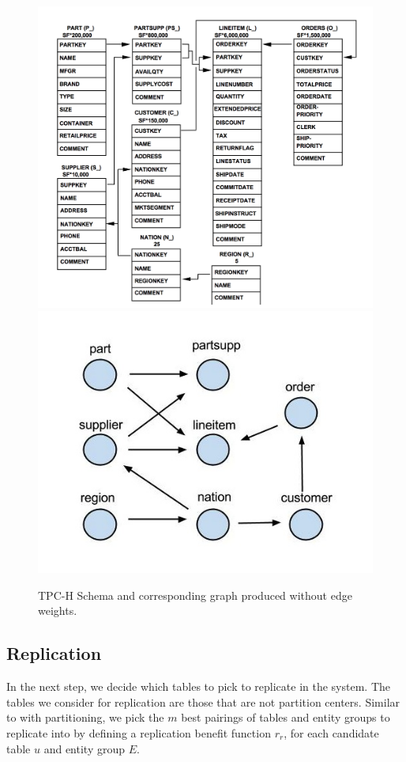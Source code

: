 \begin{figure}
\centering
\includegraphics[scale=0.3]{TPC-H_DataModel.png}
\includegraphics[scale=0.25]{ForeignJoinGraph.jpg}
\caption{\footnotesize{TPC-H Schema and corresponding graph produced without edge weights.}}
\label{fig:schema}
\end{figure}

\subsection{Replication}
In the next step, we decide which tables to pick to replicate in the system. The tables we consider for replication are those that are not partition centers.  Similar to with partitioning, we pick the $m$ best pairings of tables and entity groups to replicate into by defining a replication benefit function $r_r$, for each candidate table $u$ and entity group $E$. 

